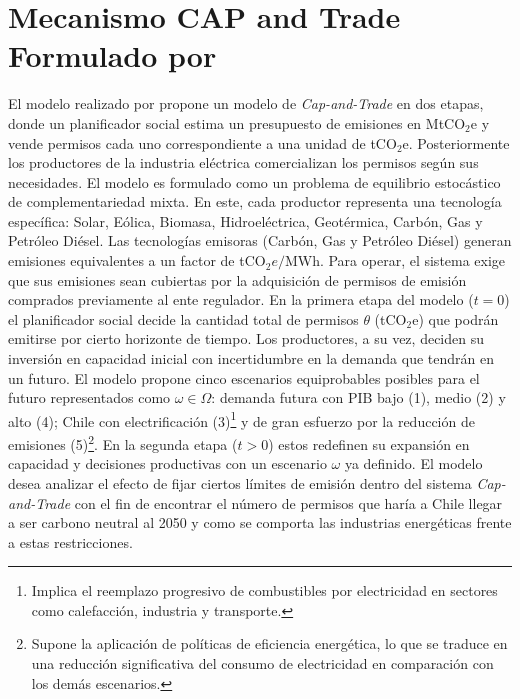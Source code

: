\section{Mecanismo CAP and Trade Formulado por \protect{}}
El modelo realizado por  propone un modelo de \textit{Cap-and-Trade} en dos etapas, donde un planificador social estima un presupuesto de emisiones en MtCO$_2$e y vende permisos cada uno correspondiente a una unidad de tCO$_2$e. Posteriormente los productores de la industria eléctrica comercializan los permisos según sus necesidades. El modelo es formulado como un problema de equilibrio estocástico de complementariedad mixta. En este, cada productor representa una tecnología específica: Solar, Eólica, Biomasa, Hidroeléctrica, Geotérmica, Carbón, Gas y Petróleo Diésel. Las tecnologías emisoras (Carbón, Gas y Petróleo Diésel) generan emisiones equivalentes a un factor de tCO$_2e/$MWh. Para operar, el sistema exige que sus emisiones sean cubiertas por la adquisición de permisos de emisión comprados previamente al ente regulador. En la primera etapa del modelo ($t=0$) el planificador social decide la cantidad total de permisos $\theta$ (tCO$_2$e) que podrán emitirse por cierto horizonte de tiempo. Los productores, a su vez, deciden su inversión en capacidad inicial con incertidumbre en la demanda que tendrán en un futuro. El modelo propone cinco escenarios equiprobables posibles para el futuro representados como $\omega \in \Omega$: demanda futura con PIB bajo (1), medio (2) y alto (4); Chile con electrificación (3)\footnote{Implica el reemplazo progresivo de combustibles por electricidad en sectores como calefacción, industria y transporte.} y de gran esfuerzo por la reducción de emisiones (5)\footnote{Supone la aplicación de políticas de eficiencia energética, lo que se traduce en una reducción significativa del consumo de electricidad en comparación con los demás escenarios.}. En la segunda etapa ($t>0$) estos redefinen su expansión en capacidad y decisiones productivas con un escenario $\omega$ ya definido. El modelo desea analizar el efecto de fijar ciertos límites de emisión dentro del sistema \textit{Cap-and-Trade} con el fin de encontrar el número de permisos que haría a Chile llegar a ser carbono neutral al 2050 y como se comporta las industrias energéticas frente a estas restricciones. \medskip

